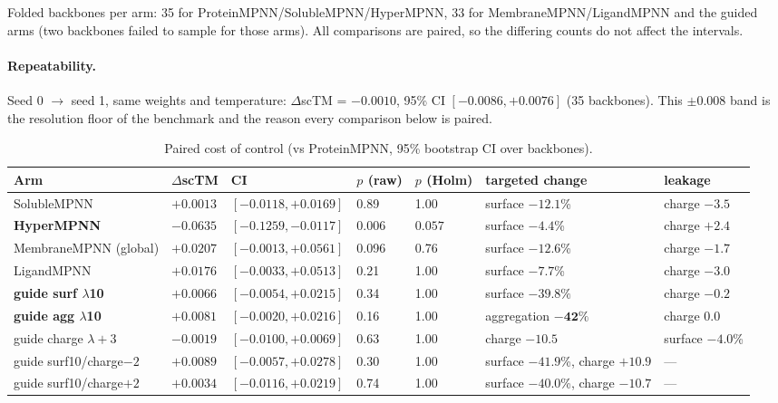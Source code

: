 Folded backbones per arm: 35 for ProteinMPNN/SolubleMPNN/HyperMPNN, 33 for
MembraneMPNN/LigandMPNN and the guided arms (two backbones failed to sample for
those arms). All comparisons are paired, so the differing counts do not affect
the intervals.

\paragraph{Repeatability.}
Seed 0 $\to$ seed 1, same weights and temperature: $\Delta$scTM =
$\bm{-0.0010}$, 95\% CI $[-0.0086, +0.0076]$ (35 backbones). This $\pm 0.008$
band is the resolution floor of the benchmark and the reason every comparison
below is paired.

\begin{table}[htbp]
  \centering
  \scriptsize
  \setlength{\tabcolsep}{2pt}
  \begin{tabular}{@{}lllllp{1.0in}l@{}}
    \toprule
    Arm & $\Delta$scTM & CI & $p$ (raw) & $p$ (Holm) & targeted change & leakage \\
    \midrule
    SolubleMPNN & $+0.0013$ & $[-0.0118, +0.0169]$ & 0.89 & 1.00 & surface $-12.1$\% & charge $-3.5$ \\
    \textbf{HyperMPNN} & $\bm{-0.0635}$ & $\bm{[-0.1259, -0.0117]}$ & $\bm{0.006}$ & $\bm{0.057}$ & surface $-4.4$\% & charge $+2.4$ \\
    MembraneMPNN (global) & $+0.0207$ & $[-0.0013, +0.0561]$ & 0.096 & 0.76 & surface $-12.6$\% & charge $-1.7$ \\
    LigandMPNN & $+0.0176$ & $[-0.0033, +0.0513]$ & 0.21 & 1.00 & surface $-7.7$\% & charge $-3.0$ \\
    \textbf{guide surf $\lambda$10} & $+0.0066$ & $[-0.0054, +0.0215]$ & 0.34 & 1.00 & surface $\bm{-39.8\%}$ & charge $-0.2$ \\
    \textbf{guide agg $\lambda$10} & $+0.0081$ & $[-0.0020, +0.0216]$ & 0.16 & 1.00 & aggregation $\bm{-42\%}$ & charge 0.0 \\
    guide charge $\lambda{+}3$ & $-0.0019$ & $[-0.0100, +0.0069]$ & 0.63 & 1.00 & charge $\bm{-10.5}$ & surface $-4.0$\% \\
    guide surf10/charge$-2$ & $+0.0089$ & $[-0.0057, +0.0278]$ & 0.30 & 1.00 & surface $-41.9$\%, \newline charge $+10.9$ & --- \\
    guide surf10/charge$+2$ & $+0.0034$ & $[-0.0116, +0.0219]$ & 0.74 & 1.00 & surface $-40.0$\%, \newline charge $-10.7$ & --- \\
    \bottomrule
  \end{tabular}
  \caption{Paired cost of control (vs ProteinMPNN, 95\% bootstrap CI over
  backbones).}
  \label{tab:paired-cost}
\end{table}

